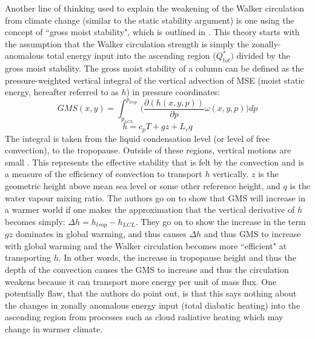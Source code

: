 \documentclass[letterpaper,12pt,titlepage,oneside,final]{book}
\begin{document}
Another line of thinking used to explain the weakening of the Walker circulation from climate change (similar to the static stability argument) is one using the concept of ``gross moist stability", which is outlined in \citep{wills_local_2017}. This theory starts with the assumption that the Walker circulation strength is simply the zonally-anomalous total energy input into the ascending region ($Q_{tot}^{*})$ divided by the gross moist stability. The gross moist stability of a column can be defined as the pressure-weighted vertical integral of the vertical advection of MSE (moist static energy, hereafter referred to as $h$) in pressure coordinates:
\begin{equation}\label{eq:GMS}
GMS(x,y) = \int_{p_{LCL}}^{p_{trop}}\bigg(\frac{\partial({h(x,y,p)})}{\partial{p}}\omega(x,y,p)\bigg){dp}
\end{equation}
\begin{equation}\label{eq:MSE}
h=c_{p}T + gz + L_{v}q
\end{equation}
The integral is taken from the liquid condensation level (or level of free convection), to the tropopause. Outside of these regions, vertical motions are small \citep{wills_local_2017}. This represents the effective stability that is felt by the convection and is a measure of the efficiency of convection to transport $h$ vertically. $z$ is the geometric height above mean sea level or some other reference height, and $q$ is the water vapour mixing ratio. The authors go on to show that GMS will increase in a warmer world if one makes the approximation that the vertical derivative of $h$ becomes simply: $\Delta{h} = h_{trop} - h_{LCL}$. They go on to show the increase in the term $gz$ dominates in global warming, and thus causes $\Delta{h}$ and thus GMS to increase with global warming and the Walker circulation becomes more ``efficient" at transporting $h$. In other words, the increase in tropopause height and thus the depth of the convection causes the GMS to increase and thus the circulation weakens because it can transport more energy per unit of mass flux. One potentially flaw, that the authors do point out, is that this says nothing about the changes in zonally anomalous energy input (total diabatic heating) into the ascending region from processes such as cloud radiative heating which may change in warmer climate.
\end{document}
